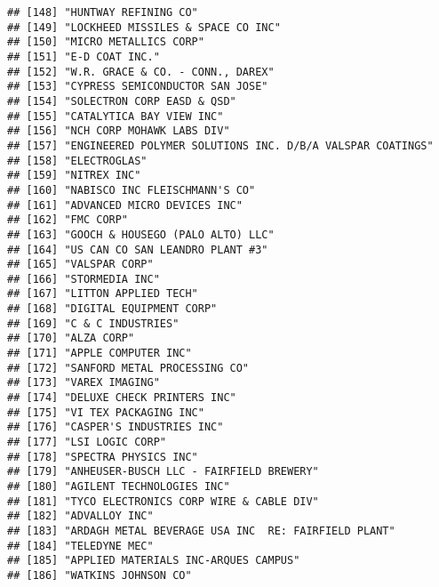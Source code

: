 \documentclass[
]{book}
\begin{document}
\begin{verbatim}
## [148] "HUNTWAY REFINING CO"                                     
## [149] "LOCKHEED MISSILES & SPACE CO INC"                        
## [150] "MICRO METALLICS CORP"                                    
## [151] "E-D COAT INC."                                           
## [152] "W.R. GRACE & CO. - CONN., DAREX"                         
## [153] "CYPRESS SEMICONDUCTOR SAN JOSE"                          
## [154] "SOLECTRON CORP EASD & QSD"                               
## [155] "CATALYTICA BAY VIEW INC"                                 
## [156] "NCH CORP MOHAWK LABS DIV"                                
## [157] "ENGINEERED POLYMER SOLUTIONS INC. D/B/A VALSPAR COATINGS"
## [158] "ELECTROGLAS"                                             
## [159] "NITREX INC"                                              
## [160] "NABISCO INC FLEISCHMANN'S CO"                            
## [161] "ADVANCED MICRO DEVICES INC"                              
## [162] "FMC CORP"                                                
## [163] "GOOCH & HOUSEGO (PALO ALTO) LLC"                         
## [164] "US CAN CO SAN LEANDRO PLANT #3"                          
## [165] "VALSPAR CORP"                                            
## [166] "STORMEDIA INC"                                           
## [167] "LITTON APPLIED TECH"                                     
## [168] "DIGITAL EQUIPMENT CORP"                                  
## [169] "C & C INDUSTRIES"                                        
## [170] "ALZA CORP"                                               
## [171] "APPLE COMPUTER INC"                                      
## [172] "SANFORD METAL PROCESSING CO"                             
## [173] "VAREX IMAGING"                                           
## [174] "DELUXE CHECK PRINTERS INC"                               
## [175] "VI TEX PACKAGING INC"                                    
## [176] "CASPER'S INDUSTRIES INC"                                 
## [177] "LSI LOGIC CORP"                                          
## [178] "SPECTRA PHYSICS INC"                                     
## [179] "ANHEUSER-BUSCH LLC - FAIRFIELD BREWERY"                  
## [180] "AGILENT TECHNOLOGIES INC"                                
## [181] "TYCO ELECTRONICS CORP WIRE & CABLE DIV"                  
## [182] "ADVALLOY INC"                                            
## [183] "ARDAGH METAL BEVERAGE USA INC  RE: FAIRFIELD PLANT"      
## [184] "TELEDYNE MEC"                                            
## [185] "APPLIED MATERIALS INC-ARQUES CAMPUS"                     
## [186] "WATKINS JOHNSON CO"                                      

\end{verbatim}
\end{document}
